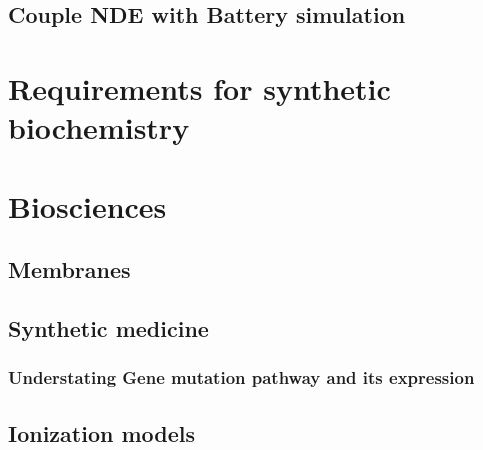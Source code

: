 \documentclass[12pt]{book}
\begin{document}
\subsection{Couple NDE with Battery simulation}

\section{Requirements for synthetic biochemistry}
\section{Biosciences}
\subsection{Membranes}
\subsection{Synthetic medicine}
\subsubsection{Understating Gene mutation pathway and its expression}


\subsection{Ionization models}
\subsection{}

\newpage


\end{document}

